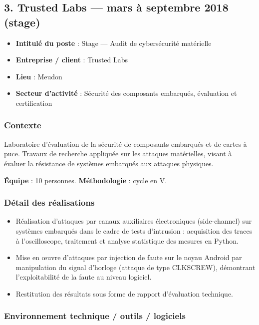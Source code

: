 \documentclass[11pt,a4paper]{article}
\begin{document}
\subsection{3. Trusted Labs --- mars à septembre 2018 (stage)}

\begin{itemize}
  \item \textbf{Intitulé du poste} : Stage --- Audit de cybersécurité matérielle
  \item \textbf{Entreprise / client} : Trusted Labs
  \item \textbf{Lieu} : Meudon
  \item \textbf{Secteur d'activité} : Sécurité des composants embarqués, évaluation et certification
\end{itemize}

\subsubsection{Contexte}

Laboratoire d'évaluation de la sécurité de composants embarqués et de cartes à puce. Travaux de recherche appliquée sur les attaques matérielles, visant à évaluer la résistance de systèmes embarqués aux attaques physiques.

\textbf{Équipe} : 10 personnes. \textbf{Méthodologie} : cycle en V.

\subsubsection{Détail des réalisations}

\begin{itemize}
  \item Réalisation d'attaques par canaux auxiliaires électroniques (side-channel) sur systèmes embarqués dans le cadre de tests d'intrusion : acquisition des traces à l'oscilloscope, traitement et analyse statistique des mesures en Python.
  \item Mise en œuvre d'attaques par injection de faute sur le noyau Android par manipulation du signal d'horloge (attaque de type CLKSCREW), démontrant l'exploitabilité de la faute au niveau logiciel.
  \item Restitution des résultats sous forme de rapport d'évaluation technique.
\end{itemize}

\subsubsection{Environnement technique / outils / logiciels}
\end{document}
